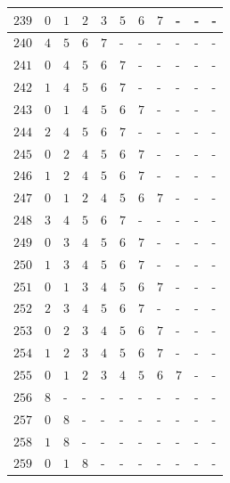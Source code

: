 \begin{appendices}
\begin{table}[H]
\begin{tabular} {|l|l|l|l|l|l|l|l|l|l|l|}
  		$ 239 $ & $ 0 $ &$ 1 $ &$ 2 $ &$ 3 $ &$ 5 $ &$ 6 $ &$ 7 $ & - &  - &  -   \\ \hline
  		$ 240 $ & $ 4 $ &$ 5 $ &$ 6 $ &$ 7 $ & - &  - &  - &  - &  - &  -   \\ \hline
  		$ 241 $ & $ 0 $ &$ 4 $ &$ 5 $ &$ 6 $ &$ 7 $ & - &  - &  - &  - &  -   \\ \hline
  		$ 242 $ & $ 1 $ &$ 4 $ &$ 5 $ &$ 6 $ &$ 7 $ & - &  - &  - &  - &  -   \\ \hline
  		$ 243 $ & $ 0 $ &$ 1 $ &$ 4 $ &$ 5 $ &$ 6 $ &$ 7 $ & - &  - &  - &  -   \\ \hline
  		$ 244 $ & $ 2 $ &$ 4 $ &$ 5 $ &$ 6 $ &$ 7 $ & - &  - &  - &  - &  -   \\ \hline
  		$ 245 $ & $ 0 $ &$ 2 $ &$ 4 $ &$ 5 $ &$ 6 $ &$ 7 $ & - &  - &  - &  -   \\ \hline
  		$ 246 $ & $ 1 $ &$ 2 $ &$ 4 $ &$ 5 $ &$ 6 $ &$ 7 $ & - &  - &  - &  -   \\ \hline
  		$ 247 $ & $ 0 $ &$ 1 $ &$ 2 $ &$ 4 $ &$ 5 $ &$ 6 $ &$ 7 $ & - &  - &  -   \\ \hline
  		$ 248 $ & $ 3 $ &$ 4 $ &$ 5 $ &$ 6 $ &$ 7 $ & - &  - &  - &  - &  -   \\ \hline
  		$ 249 $ & $ 0 $ &$ 3 $ &$ 4 $ &$ 5 $ &$ 6 $ &$ 7 $ & - &  - &  - &  -   \\ \hline
  		$ 250 $ & $ 1 $ &$ 3 $ &$ 4 $ &$ 5 $ &$ 6 $ &$ 7 $ & - &  - &  - &  -   \\ \hline
  		$ 251 $ & $ 0 $ &$ 1 $ &$ 3 $ &$ 4 $ &$ 5 $ &$ 6 $ &$ 7 $ & - &  - &  -   \\ \hline
  		$ 252 $ & $ 2 $ &$ 3 $ &$ 4 $ &$ 5 $ &$ 6 $ &$ 7 $ & - &  - &  - &  -   \\ \hline
  		$ 253 $ & $ 0 $ &$ 2 $ &$ 3 $ &$ 4 $ &$ 5 $ &$ 6 $ &$ 7 $ & - &  - &  -   \\ \hline
  		$ 254 $ & $ 1 $ &$ 2 $ &$ 3 $ &$ 4 $ &$ 5 $ &$ 6 $ &$ 7 $ & - &  - &  -   \\ \hline
  		$ 255 $ & $ 0 $ &$ 1 $ &$ 2 $ &$ 3 $ &$ 4 $ &$ 5 $ &$ 6 $ &$ 7 $ & - &  -   \\ \hline
  		$ 256 $ & $ 8 $ & - &  - &  - &  - &  - &  - &  - &  - &  -   \\ \hline
  		$ 257 $ & $ 0 $ &$ 8 $ & - &  - &  - &  - &  - &  - &  - &  -   \\ \hline
  		$ 258 $ & $ 1 $ &$ 8 $ & - &  - &  - &  - &  - &  - &  - &  -   \\ \hline
  		$ 259 $ & $ 0 $ &$ 1 $ &$ 8 $ & - &  - &  - &  - &  - &  - &  -   \\ \hline

\end{tabular}
\end{table}
\end{appendices}
